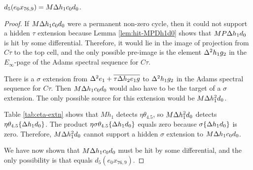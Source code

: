 
\begin{lemma}
\label{lem:d5-e0x76,9}
$d_5(e_0 x_{76,9}) = M \Delta h_1 c_0 d_0$.
\end{lemma}

\begin{proof}
If $M \Delta h_1 c_0 d_0$ were a permanent non-zero cycle, then it
could not support a hidden $\tau$ extension because
Lemma \ref{lem:hit-MPDh1d0} shows that $M P \Delta h_1 d_0$
is hit by some differential.
Therefore, it would lie in the image of projection from
$C\tau$ to the top cell, and the only possible pre-image is the
element $\Delta^2 h_1 g_2$ in the $E_\infty$-page of the
Adams spectral sequence for $C\tau$.

There is a $\sigma$ extension from $\Delta^2 e_1 + \overline{\tau \Delta h_2 e_1 g}$
to $\Delta^2 h_1 g_2$ in the Adams spectral sequence for $C\tau$.
Then $M \Delta h_1 c_0 d_0$ would also have to be the target of a 
$\sigma$ extension.
The only possible source for this extension would be $M \Delta h_1^2 d_0$.

Table \ref{tab:eta-extn} shows that $M h_1$
detects $\eta \theta_{4.5}$, so
$M \Delta h_1^2 d_0$ detects $\eta \theta_{4.5} \{\Delta h_1 d_0\}$.
The product $\eta \sigma \theta_{4.5} \{\Delta h_1 d_0\}$ equals zero
because $\sigma \{\Delta h_1 d_0\}$ is zero.
Therefore, $M \Delta h_1^2 d_0$ cannot support a hidden $\sigma$
extension to $M \Delta h_1 c_0 d_0$.

We have now shown that $M \Delta h_1 c_0 d_0$ must be hit by some
differential, and the only possibility is that equals 
$d_5(e_0 x_{76,9})$.
\end{proof}

